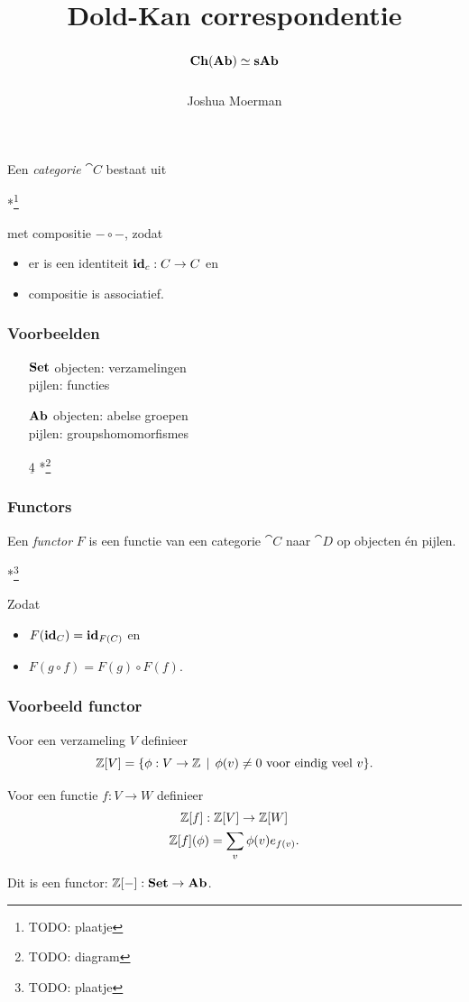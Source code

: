 \documentclass[14pt]{beamer}
\title{Dold-Kan correspondentie
	\huge $$ \mathbf{Ch}(\mathbf{Ab}) \simeq \mathbf{sAb} $$}
\author{Joshua Moerman}
\institute[Radboud Universiteit Nijmegen]{Begeleid door Moritz Groth}
\date{}
\newcommand{\td}[1]{\colorbox{todocolor}{*\footnote{TODO: #1}}}
\begin{document}
\begin{frame}
	\titlepage
\end{frame}

\begin{frame}
	Een \emph{categorie} $\cat{C}$ bestaat uit
	
	\vspace{5cm}\td{plaatje}

	met compositie $-\circ-$, zodat
	\begin{itemize}
		\item er is een identiteit $\mathbf{id}_c: C \to C$ en
		\item compositie is associatief.
	\end{itemize}
\end{frame}

\begin{frame}
	\frametitle{Voorbeelden}
	\begin{itemize}
		\item[$\mathbf{Set}$]
			objecten: verzamelingen \\
			pijlen: functies
		\item[$\mathbf{Ab}$]
			objecten: abelse groepen \\
			pijlen: groupshomomorfismes
		\item[$\underline{4}$] \td{diagram}
	\end{itemize}
\end{frame}

\begin{frame}
	\frametitle{Functors}
	Een \emph{functor} $F$ is een functie van een categorie $\cat{C}$ naar $\cat{D}$ op objecten \'en pijlen.

	\vspace{3cm}\td{plaatje}

	Zodat
	\begin{itemize}
		\item $F(\mathbf{id}_C) = \mathbf{id}_{F(C)}$ en
		\item $F(g \circ f) = F(g) \circ F(f)$.
	\end{itemize}
\end{frame}

\begin{frame}
	\frametitle{Voorbeeld functor}

	Voor een verzameling $V$ definieer
	$$ \mathbb{Z}[V] = \{ \phi: V \to \mathbb{Z} \,\mid\, \phi(v) \neq 0 \text{ voor eindig veel } v \}. $$

	\bigskip
	Voor een functie $f: V \to W$ definieer
	\begin{gather*}
		\mathbb{Z}[f]: \mathbb{Z}[V] \to \mathbb{Z}[W] \\
		\mathbb{Z}[f](\phi) = \sum_v \phi(v) e_{f(v)}.
	\end{gather*}

	\bigskip
	Dit is een functor: $\mathbb{Z}[-]: \mathbf{Set} \to \mathbf{Ab}$.
\end{frame}
\end{document}
